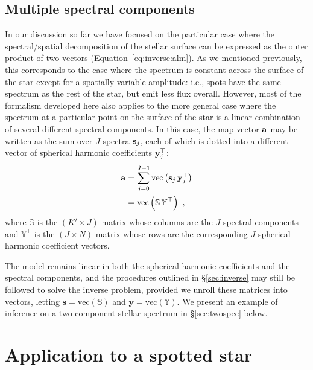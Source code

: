 \documentclass[modern]{aastex631}
\begin{document}
\subsection{Multiple spectral components}
\label{sec:eigen}
%
In our discussion so far we have focused on the particular case where the spectral/spatial decomposition of the stellar surface can be expressed as the outer product of two vectors (Equation~\ref{eq:inverse:alm}). 
As we mentioned previously, this corresponds to the case where the spectrum is constant across the surface of the star except for a spatially-variable amplitude: i.e., spots have the same spectrum as the rest of the star, but emit less flux overall. 
However, most of the formalism developed here also applies to the more general case where the spectrum at a particular point on the surface of the star is a linear combination of several different spectral components. 
In this case, the map vector ${\mathbf{a}}$ may be written as the sum over $J$ spectra ${\mathbf{s}}_j$, each of which is dotted into a different vector of spherical harmonic coefficients ${\mathbf{y}}_j^\top$:
%
\begin{align}
    \label{eq:eigen:alm}
    {\ensuremath{\mathbf{a}}}
     & =
    \sum_{j=0}^{J-1}\mathrm{vec}\left( {\mathbf{s}}_j \, {\mathbf{y}}_j^\top \right) \\
     & =
    \mathrm{vec}\left( \boldsymbol{\mathbb{S}} \, \boldsymbol{\mathbb{Y}}^\top \right) \hskip 0.33em,
\end{align}
%
where $\boldsymbol{\mathbb{S}}$ is the $(K' \times J)$ matrix whose columns are the $J$ spectral components and $\boldsymbol{\mathbb{Y}}^\top$ is the $(J \times N)$ matrix whose rows are the corresponding $J$ spherical harmonic coefficient vectors.

The model remains linear in both the spherical harmonic coefficients and the spectral components, and the procedures outlined in \S\ref{sec:inverse} may still be followed to solve the inverse problem, provided we unroll these matrices into vectors, letting $\mathbf{s} = \mathrm{vec}(\boldsymbol{\mathbb{S}})$ and $\mathbf{y} = \mathrm{vec}(\boldsymbol{\mathbb{Y}})$.
We present an example of inference on a two-component stellar spectrum in \S\ref{sec:twospec} below.

\pagebreak

\section{Application to a spotted star}
\label{sec:spotstar}
\end{document}

